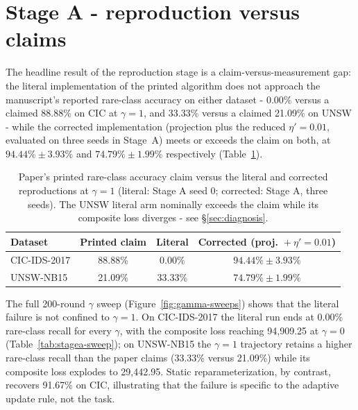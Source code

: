 \documentclass[11pt,a4paper]{report}
\begin{document}
\section{Stage A - reproduction versus claims}
\label{sec:stagea}

The headline result of the reproduction stage is a claim-versus-measurement
gap: the literal implementation of the printed algorithm does not approach
the manuscript's reported rare-class accuracy on either dataset - 0.00\%
versus a claimed 88.88\% on CIC at $\gamma = 1$, and 33.33\% versus a
claimed 21.09\% on UNSW - while the corrected implementation (projection
plus the reduced $\eta' = 0.01$, evaluated on three seeds in Stage~A)
meets or exceeds the claim on both, at $94.44\% \pm 3.93\%$ and
$74.79\% \pm 1.99\%$ respectively (Table~\ref{tab:claims}).

\begin{table}[htbp]
  \centering
  \caption{Paper's printed rare-class accuracy claim versus the literal and
  corrected reproductions at $\gamma = 1$ (literal: Stage A seed 0;
  corrected: Stage A, three seeds). The UNSW literal arm nominally exceeds
  the claim while its composite loss diverges - see \S\ref{sec:diagnosis}.}
  \label{tab:claims}
  \footnotesize
  \begin{tabular}{@{}lccc@{}}
    \toprule
    Dataset & Printed claim & Literal & Corrected (proj.\ $+\ \eta'{=}0.01$)\\
    \midrule
    CIC-IDS-2017 & 88.88\% & 0.00\%  & $94.44\% \pm 3.93\%$\\
    UNSW-NB15    & 21.09\% & 33.33\% & $74.79\% \pm 1.99\%$\\
    \bottomrule
  \end{tabular}
\end{table}

The full 200-round $\gamma$ sweep (Figure~\ref{fig:gamma-sweeps}) shows
that the literal failure is not confined to
$\gamma = 1$. On CIC-IDS-2017 the literal run ends at 0.00\% rare-class
recall for every $\gamma$, with the composite loss reaching 94{,}909.25 at
$\gamma = 0$ (Table~\ref{tab:stagea-sweep}); on UNSW-NB15 the $\gamma = 1$
trajectory retains a higher rare-class recall than the paper claims (33.33\%
versus 21.09\%) while its composite loss explodes to 29{,}442.95. Static
reparameterization, by contrast, recovers 91.67\% on CIC, illustrating that
the failure is specific to the adaptive update rule, not the task.
\end{document}
